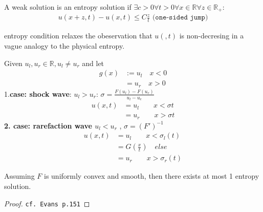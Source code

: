 \begin{definition}
	A weak solution is an entropy solution if  $\exists c > 0 \forall t > 0 \forall x \in \mathbb{R} \forall z \in \mathbb{R}_+:$
	\begin{align*}
		u(x + z, t) - u(x, t) \le C \frac{z}{t} \texttt{ (one-sided jump)}
	\end{align*}
\end{definition}
\begin{remark}
entropy condition relaxes the obeservation that $u(, t)$ is non-decresing in a vague analogy to the physical entropy. 	
\end{remark}

\begin{example}
Given $u_l, u_r \in \mathbb{R}, u_l \neq u_r$ and let
\begin{align*}
	g(x)&:= u_l \quad x < 0\\
	&= u_r \quad x > 0
\end{align*}	
1.\textbf{case: shock wave}: $u_l > u_r$: $\sigma = \frac{F(u_l) - F(u_r)}{u_l - u_e}$
\begin{align*}
	u(x, t) &= u_l \qquad x < \sigma t\\
	&= u_r \qquad x > \sigma t
\end{align*}
\textbf{2. case: rarefaction wave $u_l < u_r$} , $\sigma = (F')^{-1}$
\begin{align*}
	u(x, t) &= u_l \qquad x < \sigma_l(t) \\
	&= G(\frac{x}{t}) \quad else\\
	&= u_r \qquad x > \sigma_r(t)
\end{align*}
\end{example}

\begin{theorem}
	Assuming $F$ is uniformly convex and smooth, then there exists at most 1 entropy solution. 
\end{theorem}
\begin{proof}
	\texttt{cf. Evans p.151}
\end{proof}

